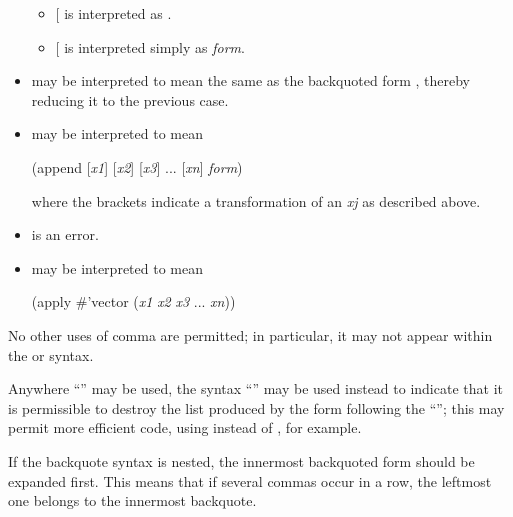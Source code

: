 \begin{flushdesc}
\begin{itemize}
\begin{itemize}
\item
{\rm [}\cd{,\emph{form}}{\rm ]} is interpreted as .

\item
{\rm [}\cd{,{\Xatsign}\emph{form}}{\rm ]} is interpreted simply as \emph{form}.
\end{itemize}

\item
{} may be interpreted to mean
the same as the backquoted form
,
thereby reducing it to the previous case.

\item
{} may be interpreted to mean
\begin{lisp}
(append {\rm [}\emph{x1}{\rm ]} {\rm [}\emph{x2}{\rm ]}
    {\rm [}\emph{x3}{\rm ]} ... {\rm [}\emph{xn}{\rm ]} \emph{form})
\end{lisp}
where the brackets indicate a transformation of an \emph{xj} as described above.

\item
{} is an error.

\item
{} may be interpreted to mean
\begin{lisp}
(apply \#'vector {\Xbq}(\emph{x1} \emph{x2} \emph{x3} ... \emph{xn}))
\end{lisp}
\end{itemize}

No other uses of comma are permitted; in particular, it may not appear within
the  or  syntax.

Anywhere ``\cd{,{\Xatsign}}'' may be used, the syntax ``'' may be used instead
to indicate that it is permissible to destroy the list produced by the form
following the ``''; this may permit more efficient code, using
 instead of , for example.

If the backquote syntax is nested, the innermost backquoted form
should be expanded first.  This means that if several commas occur
in a row, the leftmost one belongs to the innermost backquote.


\end{flushdesc}
